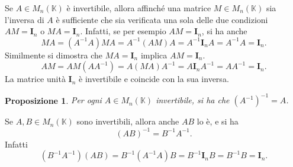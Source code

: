 \documentclass{article}
\theoremstyle{plain}
\newtheorem{prop}[thm]{Proposizione}
\theoremstyle{definition}
\theoremstyle{remark}
\begin{document}
\vspace{10pt}

Se \( A \in M_n(\mathbb{K}) \) è invertibile, allora affinché una matrice \( M \in M_n(\mathbb{K}) \) sia l'inversa di \( A \) è sufficiente che sia verificata una sola delle due condizioni \( AM = \mathbf{I}_n \) o \( MA = \mathbf{I}_n \). 
Infatti, se per esempio \( AM = \mathbf{I}_n \), si ha anche
\[MA = (A^{-1} A)MA = A^{-1}(AM)A = A^{-1} \mathbf{I}_n A = A^{-1} A = \mathbf{I}_n.\]
Similmente si dimostra che \( MA = \mathbf{I}_n \) implica \( AM = \mathbf{I}_n \).
\[AM = AM(AA^{-1}) = A(MA)A^{-1} = A\mathbf{I}_nA^{-1} = AA^{-1} = \mathbf{I}_n .\]
La matrice unità \( \mathbf{I}_n \) è invertibile e coincide con la sua inversa. 

\vspace{10pt}

\begin{bxthm}
\begin{prop}
    Per ogni $A\in M_n(\mathbb{K})$ invertibile, si ha che \( (A^{-1})^{-1} = A \).
\end{prop}
\end{bxthm}

\vspace{10pt}

Se \( A, B \in M_n(\mathbb{K}) \) sono invertibili, allora anche \( AB \) lo è, e si ha
\[(AB)^{-1} = B^{-1} A^{-1}.\]
Infatti
\[(B^{-1} A^{-1}) (AB) = B^{-1}(A^{-1} A)B = B^{-1} \mathbf{I}_n B = B^{-1} B = \mathbf{I}_n.\]

\vspace{10pt}
\end{document}
